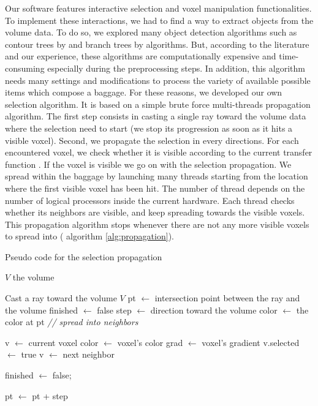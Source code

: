 Our software features interactive selection and voxel manipulation functionalities. To implement these interactions, we had to find a way to extract objects from the volume data. To do so, we explored many object detection algorithms such as contour trees by \cite{carr_computing_2000} and branch trees by \cite{pascucci_multi-resolution_2004} algorithms. But, according to the literature and our experience, these algorithms are computationally expensive and time-consuming especially during the preprocessing steps. In addition, this algorithm needs many settings and modifications to process the variety of available possible items which compose a baggage. For these reasons, we developed our own selection algorithm. It is based on a simple brute force multi-threads propagation algorithm. The first step consists in casting a single ray toward the volume data where the selection need to start (we stop its progression as soon as it hits a visible voxel). Second, we propagate the selection in every directions. For each encountered voxel, we check whether it is visible according to the current transfer function . If the voxel is visible we go on with the selection propagation. We spread within the baggage by launching many threads starting from the location where the first visible voxel has been hit. The number of thread depends on the number of logical processors inside the current hardware. Each thread checks whether its neighbors are visible, and keep spreading towards the visible voxels. This propagation algorithm stops whenever there are not any more visible voxels to spread into ( algorithm \autoref{alg:propagation}).

\begin{algorithm} \caption{Pseudo code for the selection propagation} 
\label{alg:propagation}
\begin{algorithmic}[1]
\Require $V$ the volume

\State Cast a ray toward the volume $V$  
\State  pt $\leftarrow$ intersection point between the ray and the volume \;
\State  finished $\leftarrow$ false \;
 	\State step $\leftarrow$ direction toward the volume \;
  	\State color $\leftarrow$ the color at pt \;
	\State \emph{// spread into neighbors}
    
    \State v $\leftarrow$ current voxel \;
    	\State color $\leftarrow$ voxel's color \;
        \State grad $\leftarrow$ voxel's gradient\;
         \State 	v.selected $\leftarrow$ true \;
         \EndIf
        \State  v $\leftarrow$ next neighbor \;
    \EndWhile    

    \State finished $\leftarrow$ false;
    
  \EndIf
 \State  pt $\leftarrow$ pt + step \;
\EndWhile
 
\EndIf

\end{algorithmic}
\end{algorithm}





